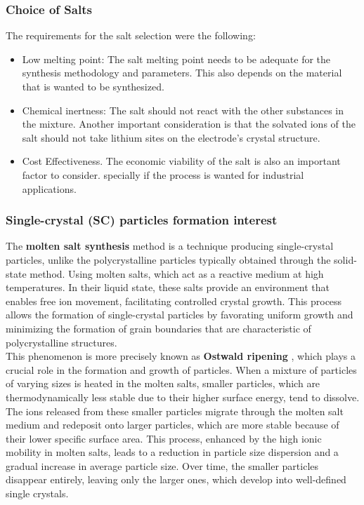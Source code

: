 \documentclass{article}
\begin{document}
\subsubsection{Choice of Salts}
The requirements for the salt selection were the following:
\begin {itemize}
\item Low melting point: The salt melting point needs to be adequate 
for the synthesis methodology and parameters. This also depends on the material
that is wanted to be synthesized.
\item Chemical inertness: The salt should not react with the other substances in the mixture. 
Another important consideration is that the solvated ions of the salt should not take lithium sites on 
the electrode's crystal structure.
\item Cost Effectiveness. The economic viability of the salt is also an important factor to consider.
specially if the process is wanted for industrial applications. 
\end{itemize}

\subsubsection{Single-crystal (SC) particles formation interest}

The \textbf{molten salt synthesis} method is a technique producing single-crystal particles, unlike the polycrystalline particles typically obtained through the solid-state method. Using molten salts, which act as a reactive medium at high temperatures. In their liquid state, these salts provide an environment that enables free ion movement, facilitating controlled crystal growth. This process allows the formation of single-crystal particles by favorating uniform growth and minimizing the formation of grain boundaries that are characteristic of polycrystalline structures. \cite{SC}
\\

This phenomenon is more precisely known as \textbf{Ostwald ripening} \cite{oswald}, which plays a crucial role in the formation and growth of particles. When a mixture of particles of varying sizes is heated in the molten salts, smaller particles, which are thermodynamically less stable due to their higher surface energy, tend to dissolve. The ions released from these smaller particles migrate through the molten salt medium and redeposit onto larger particles, which are more stable because of their lower specific surface area. This process, enhanced by the high ionic mobility in molten salts, leads to a reduction in particle size dispersion and a gradual increase in average particle size. Over time, the smaller particles disappear entirely, leaving only the larger ones, which develop into well-defined single crystals.\cite{moltensalt1}
\end{document}
